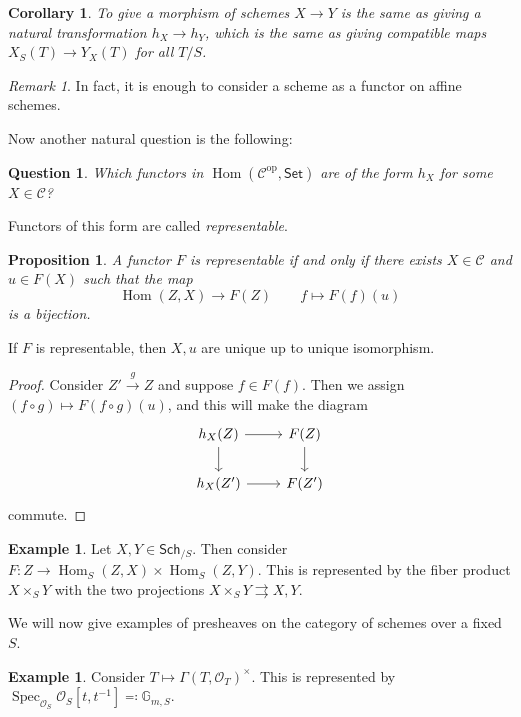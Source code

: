 \documentclass[leqno, openany]{memoir}
\newtheorem{cor}[thm]{Corollary}
\newtheorem{prop}[thm]{Proposition}
\newtheorem{quest}[thm]{Question}
\theoremstyle{definition}
\newtheorem{exm}[thm]{Example}
\theoremstyle{remark}
\newtheorem{rmk}[thm]{Remark}
\theoremstyle{plain}
\theoremstyle{definition}
\theoremstyle{remark}
\newcommand{\ms}[1]{\mathsf{#1}}
\newcommand{\msc}[1]{\mathscr{#1}}
\renewcommand{\op}{\mathrm{op}}
\DeclareMathOperator{\Hom}{Hom}
\DeclareMathOperator{\Spec}{Spec}
\begin{document}
\begin{cor}
    To give a morphism of schemes $X \to Y$ is the same as giving a natural transformation $h_X \to h_Y$, which is the same as giving compatible maps $X_S(T) \to Y_X(T)$ for all $T/S$.
\end{cor}

\begin{rmk}
    In fact, it is enough to consider a scheme as a functor on affine schemes. 
\end{rmk}

Now another natural question is the following:
\begin{quest}
    Which functors in $\Hom(\msc{C}^{\op}, \ms{Set})$ are of the form $h_X$ for some $X \in \msc{C}$?
\end{quest}
Functors of this form are called \textit{representable}.
\begin{prop}
    A functor $F$ is representable if and only if there exists $X \in \msc{C}$ and $u \in F(X)$ such that the map 
    \[ \Hom(Z,X) \to F(Z) \qquad f \mapsto F(f)(u) \]
    is a bijection.
\end{prop}
If $F$ is representable, then $X,u$ are unique up to unique isomorphism.
\begin{proof}
    Consider $Z' \xrightarrow{g} Z$ and suppose $f \in F(f)$. Then we assign $(f \circ g) \mapsto F(f \circ g)(u)$, and this will make the diagram
    \begin{equation*}
    \begin{tikzcd}
        h_X(Z) \arrow{r} \arrow{d} & F(Z) \arrow{d} \\
        h_X(Z') \arrow{r} & F(Z')
    \end{tikzcd}
    \end{equation*}
    commute.
\end{proof}

\begin{exm}
    Let $X,Y \in \ms{Sch}_{/S}$. Then consider $F \colon Z \to \Hom_S(Z,X) \times \Hom_S(Z,Y)$. This is represented by the fiber product $X \times_S Y$ with the two projections $X \times_S Y \rightrightarrows X,Y$.
\end{exm}

We will now give examples of presheaves on the category of schemes over a fixed $S$.

\begin{exm}
    Consider $T \mapsto { \Gamma(T, \msc{O}_T) }^{\times}$. This is represented by $\Spec_{ \msc{O}_S } \msc{O}_S[t, t^{-1}] \eqqcolon \mathbb{G}_{m, S}$.
\end{exm}
\end{document}
